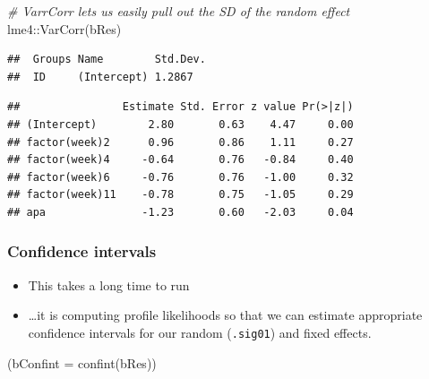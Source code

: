 \documentclass[
  openany]{book}
\newenvironment{Shaded}{\begin{snugshade}}{\end{snugshade}}
\newcommand{\AttributeTok}[1]{\textcolor[rgb]{0.77,0.63,0.00}{#1}}
\newcommand{\CommentTok}[1]{\textcolor[rgb]{0.56,0.35,0.01}{\textit{#1}}}
\newcommand{\DecValTok}[1]{\textcolor[rgb]{0.00,0.00,0.81}{#1}}
\newcommand{\FunctionTok}[1]{\textcolor[rgb]{0.00,0.00,0.00}{#1}}
\newcommand{\NormalTok}[1]{#1}
\newcommand{\SpecialCharTok}[1]{\textcolor[rgb]{0.00,0.00,0.00}{#1}}
\providecommand{\tightlist}{%
  \setlength{\itemsep}{0pt}\setlength{\parskip}{0pt}}
\begin{document}
\begin{Shaded}
\begin{Highlighting}[]
\CommentTok{\# VarrCorr lets us easily pull out the SD of the random effect}
\NormalTok{lme4}\SpecialCharTok{::}\FunctionTok{VarCorr}\NormalTok{(bRes)}
\end{Highlighting}
\end{Shaded}

\begin{verbatim}
##  Groups Name        Std.Dev.
##  ID     (Intercept) 1.2867
\end{verbatim}

\begin{Shaded}
\end{Shaded}

\begin{verbatim}
##                Estimate Std. Error z value Pr(>|z|)
## (Intercept)        2.80       0.63    4.47     0.00
## factor(week)2      0.96       0.86    1.11     0.27
## factor(week)4     -0.64       0.76   -0.84     0.40
## factor(week)6     -0.76       0.76   -1.00     0.32
## factor(week)11    -0.78       0.75   -1.05     0.29
## apa               -1.23       0.60   -2.03     0.04
\end{verbatim}

\hypertarget{confidence-intervals}{%
\subsubsection{Confidence intervals}\label{confidence-intervals}}

\begin{itemize}
\tightlist
\item
  This takes a long time to run
\item
  \ldots it is computing profile likelihoods so that we can estimate appropriate confidence intervals for our random (\texttt{.sig01}) and fixed effects.
\end{itemize}

\begin{Shaded}
\begin{Highlighting}[]
\NormalTok{(}\AttributeTok{bConfint =} \FunctionTok{confint}\NormalTok{(bRes))}
\end{Highlighting}
\end{Shaded}
\end{document}
